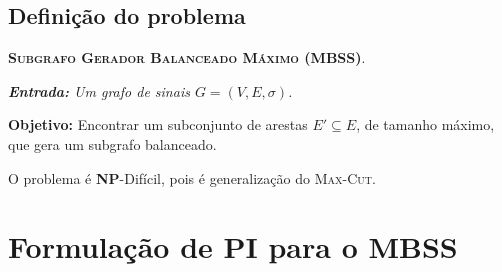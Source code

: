 \documentclass[
12pt,notheorems,hyperref={pdfauthor=whatever}
]{beamer}
\begin{document}
\subsection{Definição do problema}
\begin{frame}
    \textsc{\textbf{\color{primary} Subgrafo Gerador Balanceado Máximo (MBSS)}}.
    \vspace{0.25em}

    {\itshape
    \noindent\textbf{Entrada:} Um grafo de sinais $G=(V,E, \sigma)$.

    \noindent\textbf{Objetivo:} Encontrar um subconjunto de arestas $E' \subseteq E$, de tamanho máximo, que gera um subgrafo balanceado.}

    \pause
    \vspace{1em}
    \begin{minipage}[h][8em][c]{\textwidth}
		\centering%
		
		\small{}
	\end{minipage}
    \pause

    \vspace{1em}
    {\small\alert{O problema é \textbf{NP}-Difícil, pois é generalização do \textsc{Max-Cut}.}}
\end{frame}

\section{Formulação de PI para o MBSS}
\end{document}
